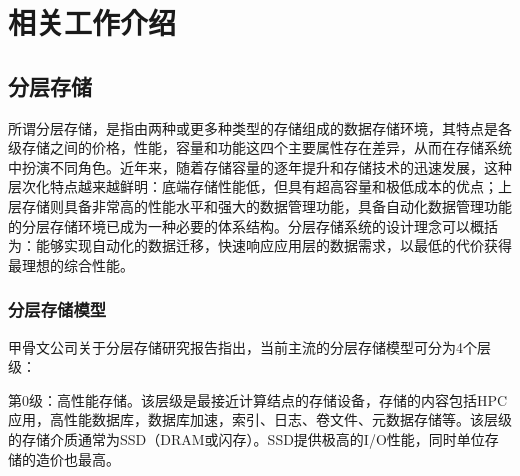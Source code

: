 \chapter{相关工作介绍}
\section{分层存储}

所谓分层存储，是指由两种或更多种类型的存储组成的数据存储环境，其特点是各级存储之间的价格，性能，容量和功能这四个主要属性存在差异，从而在存储系统中扮演不同角色。近年来，随着存储容量的逐年提升和存储技术的迅速发展，这种层次化特点越来越鲜明：底端存储性能低，但具有超高容量和极低成本的优点；上层存储则具备非常高的性能水平和强大的数据管理功能，具备自动化数据管理功能的分层存储环境已成为一种必要的体系结构。分层存储系统的设计理念可以概括为：能够实现自动化的数据迁移，快速响应应用层的数据需求，以最低的代价获得最理想的综合性能。



\subsection{分层存储模型}
甲骨文公司关于分层存储研究报告\cite{Tiered_Storage_Takes_Center_Stage}指出，当前主流的分层存储模型可分为4个层级：

第0级：高性能存储。该层级是最接近计算结点的存储设备，存储的内容包括HPC应用，高性能数据库，数据库加速，索引、日志、卷文件、元数据存储等。该层级的存储介质通常为SSD（DRAM或闪存）。SSD提供极高的I/O性能，同时单位存储的造价也最高。

